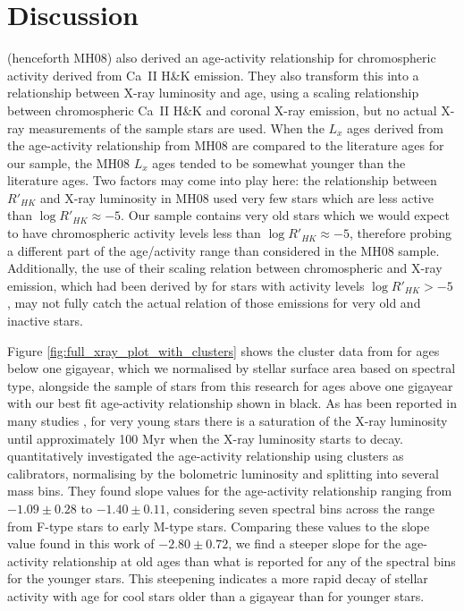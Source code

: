 \section{Discussion}
\citet{Mamajek_Hillenbrand_2008} (henceforth MH08) also derived an age-activity relationship for chromospheric activity derived from Ca~II H\&K emission. They also transform this into a relationship between X-ray luminosity and age, using a scaling relationship between chromospheric Ca~II H\&K and coronal X-ray emission, but no actual X-ray measurements of the sample stars are used. When the $L_{x}$ ages derived from the age-activity relationship from MH08 are compared to the literature ages for our sample, the MH08 $L_{x}$ ages tended to be somewhat younger than the literature ages. Two factors may come into play here: the relationship between $R'_{HK}$ and X-ray luminosity in MH08 used very few stars which are less active than $\log R'_{HK} \approx -5$. Our sample contains very old stars which we would expect to have chromospheric activity levels less than  $\log R'_{HK} \approx -5$, therefore probing a different part of the age/activity range than considered in the MH08 sample. Additionally, the use of their scaling relation between chromospheric and X-ray emission, which had been derived by \citet{Sterzik_Schmitt_1997} for stars with activity levels $\log R'_{HK} > -5$ , may not fully catch the actual relation of those emissions for very old and inactive stars.

Figure \ref{fig:full_xray_plot_with_clusters} shows the cluster data from \citet{Jackson_etal_2012} for ages below one gigayear, which we normalised by stellar surface area based on spectral type, alongside the sample of stars from this research for ages above one gigayear with our best fit age-activity relationship shown in black. As has been reported in many studies \citep{Vilhu_1984,Jardine_Unruh_1999,Pizzolato_etal_2003}, for very young stars there is a saturation of the X-ray luminosity until approximately 100 Myr when the X-ray luminosity starts to decay. \citet{Jackson_etal_2012} quantitatively investigated the age-activity relationship using clusters as calibrators, normalising by the bolometric luminosity and splitting into several mass bins. They found slope values for the age-activity relationship ranging from $-1.09 \pm 0.28$ to $-1.40 \pm 0.11$, considering seven spectral bins across the range from F-type stars to early M-type stars. Comparing these values to the slope value found in this work of $-2.80 \pm 0.72$, we find a steeper slope for the age-activity relationship at old ages than what is reported for any of the spectral bins for the younger stars. This steepening indicates a more rapid decay of stellar activity with age for cool stars older than a gigayear than for younger stars.

